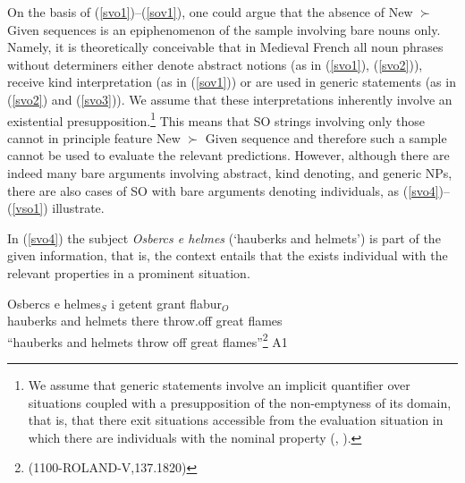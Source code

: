 \documentclass[output=paper,modfonts,nonflat]{langsci/langscibook}
\begin{document}
On the basis of (\ref{svo1})--(\ref{sov1}), one could argue that the absence of New $\succ$ Given sequences is an epiphenomenon of the sample involving bare nouns only. Namely, it is theoretically conceivable that in Medieval French all noun phrases without determiners either denote abstract notions (as in (\ref{svo1}), (\ref{svo2})), receive kind interpretation (as in (\ref{sov1})) or are used in generic statements (as in (\ref{svo2}) and (\ref{svo3})). We assume that these interpretations inherently involve an existential presupposition.\footnote{We assume that generic statements involve an implicit quantifier over situations coupled with a presupposition of the non-emptyness of its domain, that is, that there exit situations accessible from the evaluation situation in which there are individuals with the nominal property (\citet{Lee:1995}, \citet{vonFintel:1996}).} This means that SO strings involving only those cannot in principle feature New $\succ$ Given sequence and therefore such a sample cannot be used to evaluate the relevant predictions. However, although there are indeed many bare arguments involving abstract, kind denoting, and generic NPs, there are also cases of SO with bare arguments denoting individuals, as (\ref{svo4})--(\ref{vso1}) illustrate. %

In (\ref{svo4}) the subject {\it Osbercs e helmes} (`hauberks and helmets') is part of the given information, that is, the context entails that the exists individual with the relevant properties in a prominent situation.

\ea
\gll Osbercs e helmes$_{S}$ i getent grant flabur$_{O}$\\
hauberks and helmets there throw.off great flames\\
\glt ``hauberks and helmets throw off great flames''\footnote{\scriptsize{(1100-ROLAND-V,137.1820)}}\label{svo4} \hfill A1
\z


\end{document}
